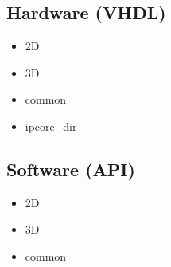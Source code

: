 \TODO

\subsection{Hardware (VHDL)}

\begin{itemize}
    \item 2D
    \item 3D
    \item common
    \item ipcore\_dir
\end{itemize}

\subsection{Software (API)}

\begin{itemize}
    \item 2D
    \item 3D
    \item common
\end{itemize}

